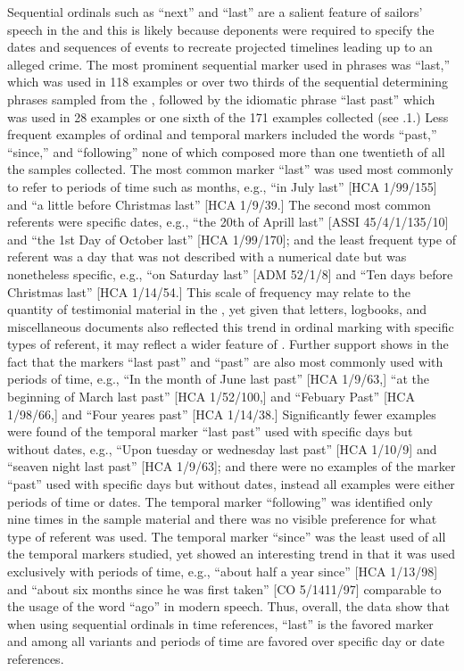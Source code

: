 Sequential ordinals such as “next” and “last” are a salient feature of sailors’ speech in the  and this is likely because deponents were required to specify the dates and sequences of events to recreate projected timelines leading up to an alleged crime. The most prominent sequential marker used in  phrases was “last,” which was used in 118 examples or over two thirds of the sequential determining phrases sampled from the , followed by the idiomatic phrase “last past” which was used in 28 examples or one sixth of the 171 examples collected (see .1.) Less frequent examples of ordinal and temporal markers included the words “past,” “since,” and “following” none of which composed more than one twentieth of all the samples collected. The most common marker “last” was used most commonly to refer to periods of time such as months, e.g., “in July last” [HCA 1/99/155] and “a little before Christmas last” [HCA 1/9/39.] The second most common referents were specific dates, e.g., “the 20th of Aprill last” [ASSI 45/4/1/135/10] and “the 1st Day of October last” [HCA 1/99/170]; and the least frequent type of referent was a day that was not described with a numerical date but was nonetheless specific, e.g., “on Saturday last” [ADM 52/1/8] and “Ten days before Christmas last” [HCA 1/14/54.] This scale of frequency may relate to the quantity of testimonial material in the , yet given that letters, logbooks, and miscellaneous documents also reflected this trend in ordinal marking with specific types of referent, it may reflect a wider feature of . Further support shows in the fact that the markers “last past” and “past” are also most commonly used with periods of time, e.g., “In the month of June last past” [HCA 1/9/63,] “at the beginning of March last past” [HCA 1/52/100,] and “Febuary Past” [HCA 1/98/66,] and “Four yeares past” [HCA 1/14/38.] Significantly fewer examples were found of the temporal marker “last past” used with specific days but without dates, e.g., “Upon tuesday or wednesday last past” [HCA 1/10/9] and “seaven night last past” [HCA 1/9/63]; and there were no examples of the marker “past” used with specific days but without dates, instead all examples were either periods of time or dates. The temporal marker “following” was identified only nine times in the sample material and there was no visible preference for what type of referent was used. The temporal marker “since” was the least used of all the temporal markers studied, yet showed an interesting trend in that it was used exclusively with periods of time, e.g., “about half a year since” [HCA 1/13/98] and “about six months since he was first taken” [CO 5/1411/97] comparable to the usage of the word “ago” in modern speech. Thus, overall, the data show that when using sequential ordinals in time references, “last” is the favored marker and among all variants and periods of time are favored over specific day or date references. 

